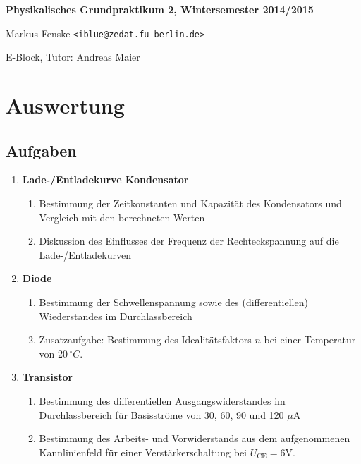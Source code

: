 \documentclass[a4paper,german,12pt,smallheadings]{scrartcl}
\begin{document}
\allowdisplaybreaks %
\begin{center}
\bfseries %
\sffamily %
\vspace{-40pt}
Physikalisches Grundpraktikum 2, Wintersemester 2014/2015

Markus Fenske \texttt{<iblue@zedat.fu-berlin.de>}

E-Block, Tutor: Andreas Maier
\vspace{-10pt}
\end{center}
\section{Auswertung}

\subsection{Aufgaben}
\begin{enumerate}
  \item \textbf{Lade-/Entladekurve Kondensator}
    \begin{enumerate}
      \item  Bestimmung der Zeitkonstanten und Kapazität des Kondensators und
        Vergleich mit den berechneten Werten
      \item Diskussion des Einflusses der Frequenz der Rechteckspannung auf die
        Lade-/Entladekurven
    \end{enumerate}
  \item \textbf{Diode}
    \begin{enumerate}
      \item Bestimmung der Schwellenspannung sowie des (differentiellen)
        Wiederstandes im Durchlassbereich
      \item Zusatzaufgabe: Bestimmung des Idealitätsfaktors $n$ bei einer
        Temperatur von $20\,^\circ C$.
    \end{enumerate}
  \item \textbf{Transistor}
    \begin{enumerate}
      \item Bestimmung des differentiellen Ausgangswiderstandes im
        Durchlassbereich für Basisströme von 30, 60, 90 und 120 $\mu$A
      \item Bestimmung des Arbeits- und Vorwiderstands aus dem aufgenommenen
        Kannlinienfeld für einer Verstärkerschaltung bei $U_\text{CE} = 6
        \text{V}$.
    \end{enumerate}
\end{enumerate}
\end{document}
